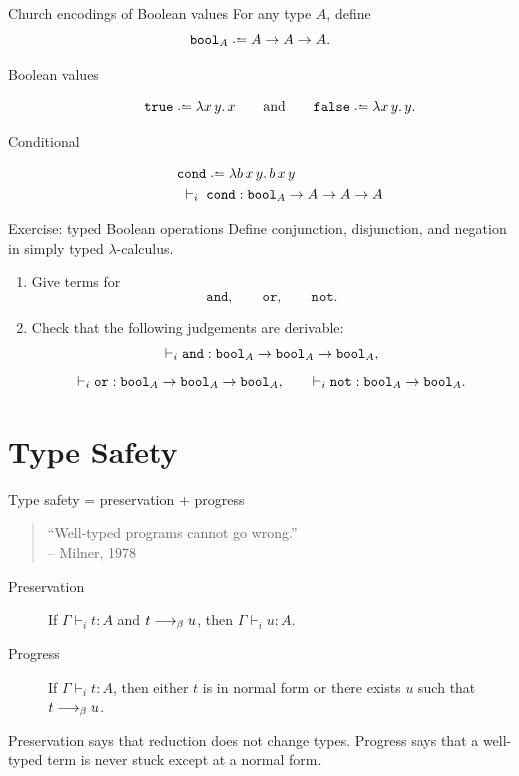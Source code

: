 \begin{frame}{Church encodings of Boolean values}
  For any type $A$, define
  \[
    \bool_A \defeq A \to A \to A.
  \]

  \begin{description}
    \item[Boolean values]
      \[
        \true \defeq \lambda x\,y.\,x
        \qquad\text{and}\qquad
        \false \defeq \lambda x\,y.\,y.
      \]

    \item[Conditional]
      \begin{align*}
        \cond &\defeq \lambda b\,x\,y.\,b\,x\,y \\
        \vdash_i{}\; &\cond : \bool_A \to A \to A \to A
      \end{align*}
  \end{description}
\end{frame}

\begin{frame}{Exercise: typed Boolean operations}
  Define conjunction, disjunction, and negation in simply typed $\lambda$-calculus.

  \begin{enumerate}
    \item Give terms for
      \[
        \mathtt{and},\qquad \mathtt{or},\qquad \mathtt{not}.
      \]

    \item Check that the following judgements are derivable:
      \[
        \vdash_i \mathtt{and} : \mathtt{bool}_A \to \mathtt{bool}_A \to \mathtt{bool}_A,
      \]
      \[
        \vdash_i \mathtt{or} : \mathtt{bool}_A \to \mathtt{bool}_A \to \mathtt{bool}_A,
        \qquad
        \vdash_i \mathtt{not} : \mathtt{bool}_A \to \mathtt{bool}_A.
      \]
  \end{enumerate}
\end{frame}

\section{Type Safety}

\begin{frame}[c]{Type safety = preservation + progress}
  \begin{quote}
    ``Well-typed programs cannot go wrong.''\\
    \hfill -- Milner, 1978
  \end{quote}

  \begin{description}
    \item[Preservation]
      If $\Gamma \vdash_i t : A$ and $t \longrightarrow_{\beta} u$, then
      $\Gamma \vdash_i u : A$.

    \item[Progress]
      If $\Gamma \vdash_i t : A$, then either $t$ is in normal form or there
      exists $u$ such that $t \longrightarrow_{\beta} u$.
  \end{description}

  \vfill

  Preservation says that reduction does not change types.  Progress says that a
  well-typed term is never stuck except at a normal form.
\end{frame}

